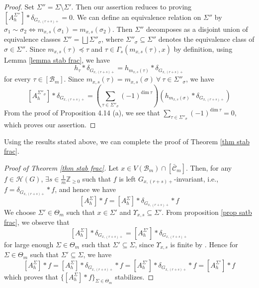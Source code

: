 \documentclass[11 pt]{article}
\numberwithin{equation}{subsection}
\theoremstyle{definition}
\theoremstyle{remark}
\theoremstyle{conjecture}
\newcommand{\Z}{\mathbb Z}
\newcommand{\HH}{\mathcal H}
\newcommand{\B}{\mathcal{B}}
\newcommand{\mcC}{\mathcal C}
\begin{document}
\begin{proof}
    Set $\Sigma''=\Sigma \setminus \Sigma'$. Then our assertion reduces to proving $[A^{\Sigma''}_h]*\delta_{G_{x,(r+s)+}}=0$. We can define an equivalence relation on $\Sigma''$ by $\sigma_1 \sim \sigma_2 \Leftrightarrow m_{x,s}(\sigma_1)=m_{x,s}(\sigma_2)$.  Then $\Sigma''$ decomposes as a disjoint union of equivalence classes $\Sigma'' = \bigsqcup {\Sigma''}_\sigma$, where ${\Sigma''}_\sigma\subseteq \Sigma''$ denotes the equivalence class of $\sigma \in \Sigma''$. Since $m_{x,s}(\tau) \preceq \tau$ and $\tau \in \Gamma_s(m_{x,s}(\tau),x)$ by definition, using Lemma \ref{lemma stab frac}, we have $$h_{\tau}* \delta_{G_{x,(r+s)+}}=h_{m_{x,s}(\tau)}*\delta_{G_{x,(r+s)+}}$$
    for every $\tau \in [\B_m]$. Since $m_{x,s}(\tau)=m_{x,s}(\sigma)\: \forall \: \tau \in {\Sigma''}_\sigma$, we have  \[
    [A^{{\Sigma''}_\sigma}_h]*\delta_{G_{x,(r+s)+}}=\left(\sum_{\tau \in {\Sigma''}_\sigma}(-1)^{\text{dim}\: \tau}\right)\left(h_{m_{x,s}(\sigma)}*\delta_{G_{x,(r+s)+}}\right)
    \]
    From the proof of Proposition 4.14 (a), we see that $\sum_{\tau \in {\Sigma''}_\sigma}(-1)^{\text{dim}\: \tau}=0$, which proves our assertion. 
\end{proof}
Using the results stated above, we can complete the proof of Theorem \ref{thm stab frac}. 
\begin{proof}[ Proof of Theorem \ref{thm stab frac}] 
    Let $x\in V(\B_m) \cap [\bar{\mcC}_m]$. Then, for any $f \in \HH(G)$, $\exists s \in \frac{1}{m}\Z_{\geq 0}$ such that $f$ is left $G_{x,(r+s)+}$-invariant, i.e., $f= \delta_{G_{x,(r+s)+}}*f$, and hence we have 
    \[
    [A^\Sigma_h] * f=[A^\Sigma_h]* \delta_{G_{x,(r+s)+}}*f
    \]
    We choose $\Sigma' \in \Theta_m$ such that $x\in \Sigma'$ and $\Upsilon_{x,s} \subseteq \Sigma'$. From proposition \ref{prop satb frac}, we observe that 
    \[
    [A^{\Sigma}_h]* \delta_{G_{x,(r+s)+}}=[A^{\Sigma'}_h]*\delta_{G_{x,(r+s)+}}
    \]
    for large enough $\Sigma \in \Theta_m$ such that $\Sigma' \subseteq \Sigma$, since $\Upsilon_{x,s}$ is finite by \cite[ Lemma 4.4]{BKV2}. Hence for $\Sigma \in \Theta_m$ such that $\Sigma' \subseteq \Sigma$, we have 
   \[
   [A^\Sigma_h] * f=[A^\Sigma_h]* \delta_{G_{x,(r+s)+}}*f=[A^{\Sigma'}_h]*\delta_{G_{x,(r+s)+}}*f=[A^{\Sigma'}_h]*f
   \]
   which proves that $\{[A^\Sigma_h] * f\}_{\Sigma \in \Theta_m} $ stabilizes.
\end{proof}
\end{document}
